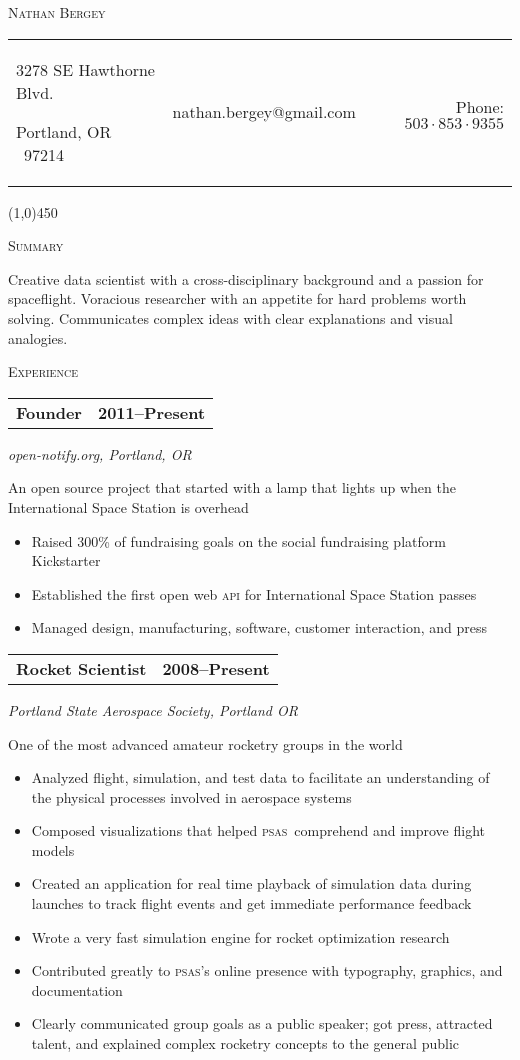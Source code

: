 \documentclass[letterpaper,10pt]{article}
\makeatletter
\newcommand{\me}      {Nathan Bergey}
\newcommand{\email}   {nathan.bergey@gmail.com}
\newcommand{\address} {\begin{minipage}{2in}\raggedright3278 SE Hawthorne Blvd.\par Portland, OR \ 97214\end{minipage}}
\newcommand{\phone}   {$503\cdot853\cdot9355$}
\newcommand{\PSAS}{\textsc{psas}}
\newcommand{\resumepageheader}{
  \begin{center}
    {\LARGE{\textsc{\me}}}

    \vspace{0.2in}

    \begin{tabular*}{6.5in}{l c@{\extracolsep{\fill}} r}
      \address & \email & Phone: \phone \\
    \end{tabular*}
    
    \vspace{0.02in}

    \line(1,0){450}
  \end{center}
}
\newcommand{\resumestatement}[1]{
  \vspace{0.05in}
  \textsc{\Large Summary}
  \vspace{0.1in}
  \begin{center}
    \begin{minipage}{5.5in}
      \small
      #1
    \end{minipage}
  \end{center}
}
\newcommand{\resumeheader}[1]{
  \vspace{0.08in}
  \textsc{\Large #1}
  \vspace{0.10in}
}
\newcommand{\resumeitem}[4]{
  {\addtolength{\leftskip}{0.21in}
    \begin{tabular*}{6.25in}{l@{\extracolsep{\fill}} r}
      {\textbf{#1}} & {\textbf{#2}} \\
    \end{tabular*}
    
  }
  
  \vspace{0.01in}
  {\addtolength{\leftskip}{0.3in}
    \textit{#3}\par
  }
  
  \vspace{0.07in}
  {\addtolength{\leftskip}{0.3in}
    \small
    \begin{minipage}{5in}
      #4
    \end{minipage}
    
  }
  \vspace{0.15in}
}
\makeatother
\begin{document}
\resumepageheader

\resumestatement{
                  Creative data scientist with a cross-disciplinary background 
                  and a passion for spaceflight. Voracious researcher with an 
                  appetite for hard problems worth solving. Communicates complex 
                  ideas with clear explanations and visual analogies.
                }


\resumeheader{Experience} 

\resumeitem{Founder}{2011--Present}%
           {open-notify.org, Portland, OR}%
           {
              An open source project that started with a lamp that lights up when the 
              International Space Station is overhead
              \begin{itemize}[topsep=1pt, itemsep=0pt, parsep=0pt]
                \renewcommand{\labelitemi}{---}
                \item Raised 300\% of fundraising goals on the social fundraising platform Kickstarter
                \item Established the first open web \textsc{api} for International Space Station passes
                \item Managed design, manufacturing, software, customer interaction, and press
              \end{itemize}
           }

\resumeitem{Rocket Scientist}{2008--Present}%
           {Portland State Aerospace Society, Portland OR}%
           {
              One of the most advanced amateur rocketry groups in the world
              \begin{itemize}[topsep=1pt, itemsep=0pt, parsep=0pt]
                \renewcommand{\labelitemi}{---}
                \item Analyzed flight, simulation, and test data to facilitate an understanding of the physical processes involved in aerospace systems
                \item Composed visualizations that helped \PSAS\ comprehend and improve flight models
                \item Created an application for real time playback of simulation data during launches to track flight events and get immediate performance feedback
                \item Wrote a very fast simulation engine for rocket optimization research
                \item Contributed greatly to \PSAS's online presence with typography, graphics, and documentation
                \item Clearly communicated group goals as a public speaker; got press, attracted talent, and explained complex rocketry concepts to the general public
              \end{itemize}
           }
           
\end{document}
